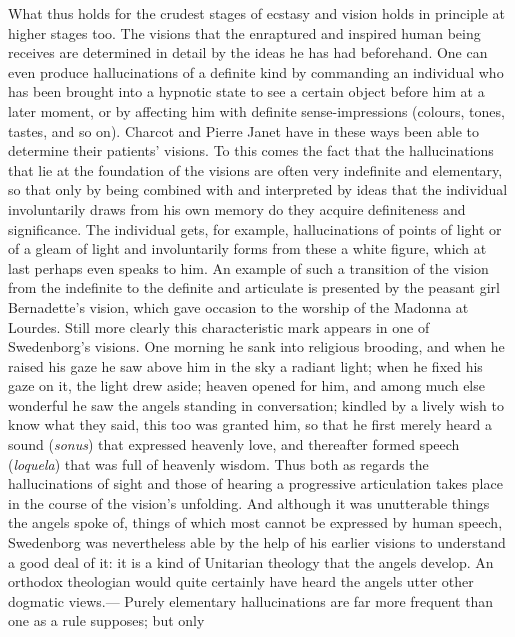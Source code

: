 \documentclass[12pt,a4paper]{book}
\newcommand{\opage}[1]{\marginnote{\footnotesize\textit{[#1]}}}
\begin{document}
What thus holds for the crudest stages of ecstasy and vision holds in principle at higher
stages too. The visions that the enraptured and inspired human being receives are determined
in detail by the ideas he has had beforehand. One can even produce hallucinations of a definite
kind by commanding an individual who has been brought into a hypnotic state to see a certain
object before him at a later moment, or by affecting him with definite sense-impressions
(colours, tones, tastes, and so on). Charcot and Pierre Janet have in these ways been able to
determine their patients' visions. To this comes the fact that the hallucinations that lie at
the foundation of the visions are often very indefinite and elementary, so that only by being
combined with and interpreted by ideas that the individual involuntarily draws from his own
memory do they acquire definiteness and significance. The individual gets, for example,
hallucinations of points of light or of a gleam of light and involuntarily forms from these a
white figure, which at last perhaps even speaks to him. An example of such a transition of the
vision from the indefinite to the definite and articulate is presented by the peasant girl
Bernadette's vision, which gave occasion to the worship of the Madonna at Lourdes. Still more
clearly this characteristic mark appears in one of Swedenborg's visions. One morning he sank
into religious brooding, and when he raised his gaze he saw above him in the sky a radiant
light; when he fixed his gaze on it, the light drew aside; heaven opened for him, and among much
else wonderful he saw the angels standing in conversation; kindled by a lively wish to know what
they said, this too was granted him, so that he first merely heard a sound (\textit{sonus}) that
expressed heavenly love, and thereafter formed speech (\textit{loquela}) that was full of
heavenly wisdom. Thus both as regards the hallucinations of sight and those of hearing a
progressive articulation takes place in the course of the vision's unfolding. And although it
was unutterable things the angels spoke of, things of which most cannot be expressed by human
speech, Swedenborg was nevertheless able by the help of his earlier visions to understand a good
deal of it: it is a kind of Unitarian theology that the angels develop. An orthodox theologian
would quite certainly have heard the angels utter other dogmatic views.---
\opage{111}Purely elementary hallucinations are far more frequent than one as a rule supposes; but only
\end{document}
